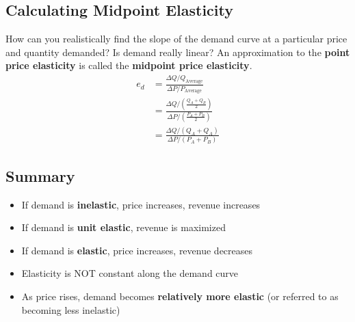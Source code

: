 \subsection{Calculating Midpoint Elasticity}
How can you realistically find the slope of the demand curve at a particular price and quantity demanded? Is demand really linear? An approximation to the \textbf{point price elasticity} is called the \textbf{midpoint price elasticity}.
\begin{align*}
e_d &= \frac{\Delta Q/Q_\text{Average}}{\Delta P/P_\text{Average}}\\
&= \frac{\Delta Q/\left(\frac{Q_A + Q_B}{2}\right)}{\Delta P/\left(\frac{P_A + P_B}{2}\right)}\\
&= \frac{\Delta Q/\left(Q_A + Q_A\right)}{\Delta P/\left(P_A + P_B\right)}
\end{align*}

\subsection{Summary}
\begin{itemize}
	\item If demand is \textbf{inelastic}, price increases, revenue increases
	\item If demand is \textbf{unit elastic}, revenue is maximized
	\item If demand is \textbf{elastic}, price increases, revenue decreases
	\item Elasticity is NOT constant along the demand curve
	\item As price rises, demand becomes \textbf{relatively more elastic} (or referred to as becoming less inelastic)
\end{itemize}
